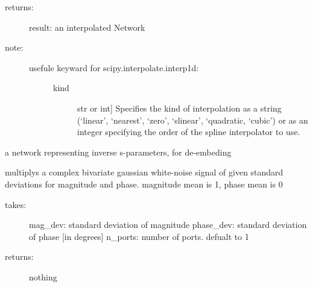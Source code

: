 \documentclass[letterpaper,10pt,english]{sphinxmanual}
\begin{document}
\begin{fulllineitems}
\begin{fulllineitems}
\begin{description}
\item[{returns:}] \leavevmode
result: an interpolated Network

\item[{note:}] \leavevmode\begin{description}
\item[{usefule keyward for  scipy.interpolate.interp1d:}] \leavevmode\begin{description}
\item[{kind}] \leavevmode{[}str or int{]}
Specifies the kind of interpolation as a string (`linear',
`nearest', `zero', `slinear', `quadratic, `cubic') or as an integer
specifying the order of the spline interpolator to use.

\end{description}

\end{description}

\end{description}

\end{fulllineitems}


\begin{fulllineitems}
\label{api/mwavepy:mwavepy.network.Network.inv}
a network representing inverse s-parameters, for de-embeding

\end{fulllineitems}


\begin{fulllineitems}
\label{api/mwavepy:mwavepy.network.Network.multiply_noise}
multiplys a complex bivariate gaussian white-noise signal
of given standard deviations for magnitude and phase.   
magnitude mean is 1, phase mean is 0
\begin{description}
\item[{takes:}] \leavevmode
mag\_dev: standard deviation of magnitude
phase\_dev: standard deviation of phase {[}in degrees{]}
n\_ports: number of ports. defualt to 1

\item[{returns:}] \leavevmode
nothing

\end{description}


\end{fulllineitems}
\end{fulllineitems}
\end{document}
